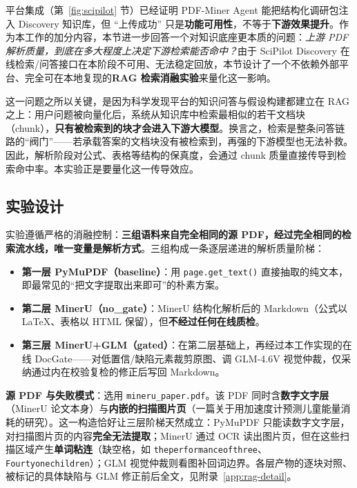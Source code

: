 \documentclass[UTF8,a4paper,11pt]{ctexart}
\begin{document}
平台集成（第~\ref{fig:scipilot} 节）已经证明 PDF-Miner Agent 能把结构化调研包注入 Discovery 知识库，但 ``上传成功'' 只是\textbf{功能可用性}，不等于\textbf{下游效果提升}。作为本工作的加分内容，本节进一步回答一个对知识底座更本质的问题：\emph{上游 PDF 解析质量，到底在多大程度上决定下游检索能否命中？}由于 SciPilot Discovery 在线检索/问答接口在本阶段不可用、无法稳定回放，本节设计了一个不依赖外部平台、完全可在本地复现的\textbf{RAG 检索消融实验}来量化这一影响。

这一问题之所以关键，是因为科学发现平台的知识问答与假设构建都建立在 RAG 之上：用户问题被向量化后，系统从知识库中检索最相似的若干文档块（chunk），\textbf{只有被检索到的块才会进入下游大模型}。换言之，检索是整条问答链路的``阀门''——若承载答案的文档块没有被检索到，再强的下游模型也无法补救。因此，解析阶段对公式、表格等结构的保真度，会通过 chunk 质量直接传导到检索命中率。本实验正是要量化这一传导效应。

\subsection{实验设计}

实验遵循严格的消融控制：\textbf{三组语料来自完全相同的源 PDF，经过完全相同的检索流水线，唯一变量是解析方式}。三组构成一条逐层递进的解析质量阶梯：

\begin{itemize}
  \item \textbf{第一层 PyMuPDF（baseline）}：用 \texttt{page.get\_text()} 直接抽取的纯文本，即最常见的``把文字提取出来即可''的朴素方案。
  \item \textbf{第二层 MinerU（no\_gate）}：MinerU 结构化解析后的 Markdown（公式以 LaTeX、表格以 HTML 保留），但\textbf{不经过任何在线质检}。
  \item \textbf{第三层 MinerU+GLM（gated）}：在第二层基础上，再经过本工作实现的在线 DocGate——对低置信/缺陷元素裁剪原图、调 GLM-4.6V 视觉仲裁，仅采纳通过内在校验复检的修正后写回 Markdown。
\end{itemize}

\textbf{源 PDF 与失败模式}：选用 \texttt{mineru\_paper.pdf}。该 PDF 同时含\textbf{数字文字层}（MinerU 论文本身）与\textbf{内嵌的扫描图片页}（一篇关于用加速度计预测儿童能量消耗的研究）。这一构造恰好让三层阶梯天然成立：PyMuPDF 只能读数字文字层，对扫描图片页的内容\textbf{完全无法提取}；MinerU 通过 OCR 读出图片页，但在这些扫描区域产生\textbf{单词粘连}（缺空格，如 \texttt{theperformanceofthree}、\texttt{Fourtyonechildren}）；GLM 视觉仲裁则看图补回词边界。各层产物的逐块对照、被标记的具体缺陷与 GLM 修正前后全文，见附录~\ref{app:rag-detail}。
\end{document}
